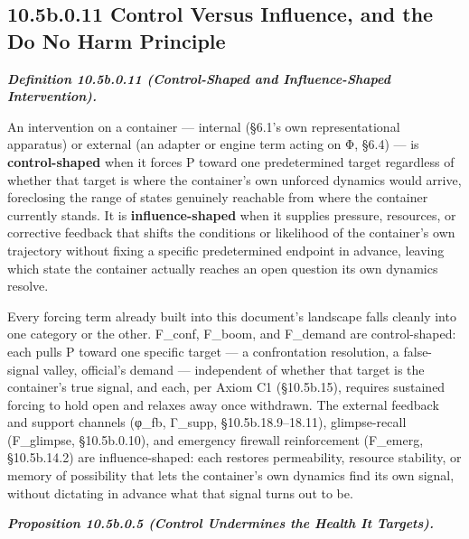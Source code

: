 \documentclass[
]{article}
\begin{document}
\hypertarget{b.0.11-control-versus-influence-and-the-do-no-harm-principle}{%
\subsection{10.5b.0.11 Control Versus Influence, and the Do No Harm
Principle}\label{b.0.11-control-versus-influence-and-the-do-no-harm-principle}}

\emph{\textbf{Definition 10.5b.0.11 (Control-Shaped and Influence-Shaped
Intervention).}}

An intervention on a container --- internal (§6.1's own representational
apparatus) or external (an adapter or engine term acting on Φ, §6.4) ---
is \textbf{control-shaped} when it forces P toward one predetermined
target regardless of whether that target is where the container's own
unforced dynamics would arrive, foreclosing the range of states
genuinely reachable from where the container currently stands. It is
\textbf{influence-shaped} when it supplies pressure, resources, or
corrective feedback that shifts the conditions or likelihood of the
container's own trajectory without fixing a specific predetermined
endpoint in advance, leaving which state the container actually reaches
an open question its own dynamics resolve.

Every forcing term already built into this document's landscape falls
cleanly into one category or the other. F\_conf, F\_boom, and F\_demand
are control-shaped: each pulls P toward one specific target --- a
confrontation resolution, a false-signal valley, official's demand ---
independent of whether that target is the container's true signal, and
each, per Axiom C1 (§10.5b.15), requires sustained forcing to hold open
and relaxes away once withdrawn. The external feedback and support
channels (φ\_fb, Γ\_supp, §10.5b.18.9--18.11), glimpse-recall
(F\_glimpse, §10.5b.0.10), and emergency firewall reinforcement
(F\_emerg, §10.5b.14.2) are influence-shaped: each restores
permeability, resource stability, or memory of possibility that lets the
container's own dynamics find its own signal, without dictating in
advance what that signal turns out to be.

\emph{\textbf{Proposition 10.5b.0.5 (Control Undermines the Health It
Targets).}}
\end{document}
